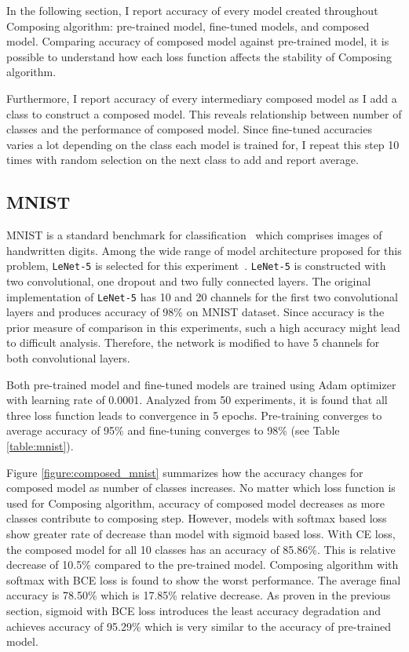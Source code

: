 \documentclass{article}
\begin{document}
In the following section, I report accuracy of every model created throughout Composing algorithm: pre-trained model, fine-tuned models, and composed model. Comparing accuracy of composed model against pre-trained model, it is possible to understand how each loss function affects the stability of Composing algorithm.

Furthermore, I report accuracy of every intermediary composed model as I add a class to construct a composed model. This reveals relationship between number of classes and the performance of composed model. Since fine-tuned accuracies varies a lot depending on the class each model is trained for, I repeat this step 10 times with random selection on the next class to add and report average.

\subsection{MNIST}

MNIST is a standard benchmark for classification~\cite{lecun1998gradient} which comprises images of handwritten digits. Among the wide range of model architecture proposed for this problem, \texttt{LeNet-5} is selected for this experiment~\cite{lecun2015lenet}. \texttt{LeNet-5} is constructed with two convolutional, one dropout and two fully connected layers. The original implementation of \texttt{LeNet-5} has 10 and 20 channels for the first two convolutional layers and produces accuracy of 98\% on MNIST dataset. Since accuracy is the prior measure of comparison in this experiments, such a high accuracy might lead to difficult analysis. Therefore, the network is modified to have 5 channels for both convolutional layers.

Both pre-trained model and fine-tuned models are trained using Adam optimizer with learning rate of 0.0001. Analyzed from 50 experiments, it is found that all three loss function leads to convergence in 5 epochs. Pre-training converges to average accuracy of 95\% and fine-tuning converges to 98\% (see Table \ref{table:mnist}).

Figure \ref{figure:composed_mnist} summarizes how the accuracy changes for composed model as number of classes increases. No matter which loss function is used for Composing algorithm, accuracy of composed model decreases as more classes contribute to composing step. However, models with softmax based loss show greater rate of decrease than model with sigmoid based loss. With CE loss, the composed model for all 10 classes has an accuracy of 85.86\%. This is relative decrease of 10.5\% compared to the pre-trained model. Composing algorithm with softmax with BCE loss is found to show the worst performance. The average final accuracy is 78.50\% which is 17.85\% relative decrease. As proven in the previous section, sigmoid with BCE loss introduces the least accuracy degradation and achieves accuracy of 95.29\% which is very similar to the accuracy of pre-trained model.
\end{document}
